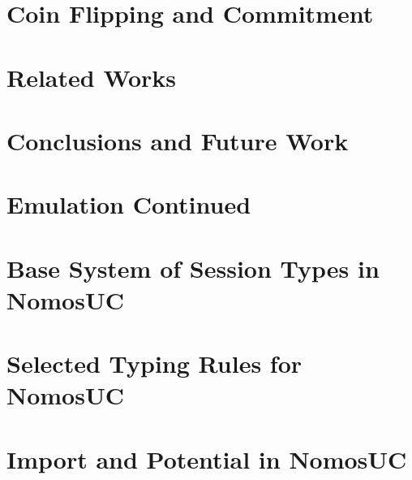 \documentclass[conference]{IEEEtran}
\begin{document}
%
\section{Coin Flipping and Commitment} \label{sec:commitment}



\section{Related Works} \label{sec:related}


\section{Conclusions and Future Work}





\newpage


\appendices

% 

\section{Emulation Continued} \label{app:emulation}


\section{Base System of Session Types in NomosUC} \label{app:basic}


\section{Selected Typing Rules for NomosUC} \label{app:typing_rules}


\section{Import and Potential in NomosUC} \label{sec:import}

\end{document}
